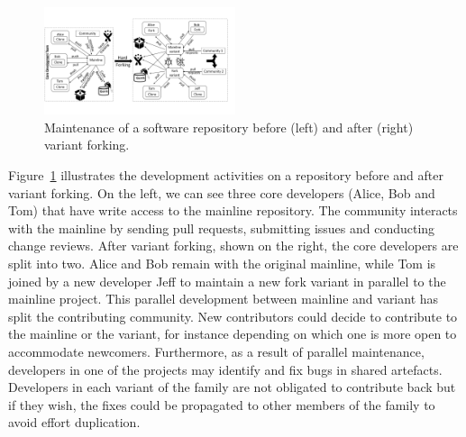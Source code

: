 \begin{figure}[ht]
  \begin{center}
  \small
    \includegraphics[width=0.5\textwidth]{figures/Collaboration.pdf}
  \end{center}
  \caption{Maintenance of a software repository before (left) and after (right) variant forking.}
  \label{fig:forking}
\end{figure}

Figure~\ref{fig:forking} illustrates the development activities on a repository before and after variant forking.
On the left, we can see three core developers (Alice, Bob and Tom) that have write access to the mainline repository.%
The community interacts with the mainline by sending pull requests, submitting issues and conducting change reviews.
After variant forking, shown on the right, the core developers are split into two.
Alice and Bob remain with the original mainline, while Tom is joined by a new developer Jeff to maintain a new fork variant in parallel to the mainline project.
This parallel development between mainline and variant has split the contributing community. New contributors could decide to contribute to the mainline or the variant, for instance depending on which one is more open to accommodate newcomers.
Furthermore, as a result of parallel maintenance, developers in one of the projects may identify and fix bugs in shared artefacts.
Developers in each variant of the family are not obligated to contribute back but if they wish, the fixes could be propagated to other members of the family to avoid effort duplication.

